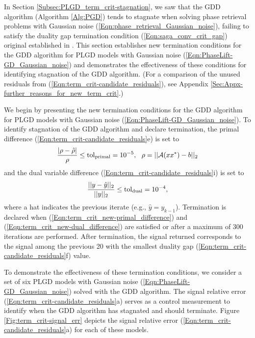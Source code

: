 In Section \ref{Subsec:PLGD_term_crit-stagnation}, we saw that the GDD algorithm (Algorithm \ref{Alg:PGD}) tends to stagnate when solving phase retrieval problems with Gaussian noise (\ref{Eqn:phase_retrieval_Gaussian_noise}), failing to satisfy the duality gap termination condition (\ref{Eqn:saga_conv_crit_gap}) original established in \cite{DBLP:journals/siamsc/FriedlanderM16}.  
This section establishes new termination conditions for the GDD algorithm for PLGD models with Gaussian noise (\ref{Eqn:PhaseLift-GD_Gaussian_noise}) and demonstrates the effectiveness of these conditions for identifying stagnation of the GDD algorithm.  
(For a comparison of the unused residuals from (\ref{Eqn:term_crit-candidate_residuals}), see Appendix \ref{Sec:Appx-further_reasons_for_new_term_crit}.)







We begin by presenting the new termination conditions for the GDD algorithm for PLGD models with Gaussian noise (\ref{Eqn:PhaseLift-GD_Gaussian_noise}).  To identify stagnation of the GDD algorithm and declare termination, the primal difference (\ref{Eqn:term_crit-candidate_residuals}e) is set to 
\begin{equation}
	\label{Eqn:term_crit_new-primal_difference}
\frac{| \rho - \hat{\rho} |}{\rho} \leq  \textnormal{tol}_\textnormal{primal} = 10^{-5}, \ \ \rho = ||{\mathcal A}(xx^*) - b||_2
\end{equation}
and the dual variable difference (\ref{Eqn:term_crit-candidate_residuals}i) is set to
\begin{equation}
	\label{Eqn:term_crit_new-dual_difference}
\frac{||y- \hat{y}||_2}{||y||_2} \leq \textnormal{tol}_\textnormal{dual}= 10^{-4},
\end{equation}
where a hat indicates the previous iterate (e.g., $\hat{y} = y_{k-1}$).  Termination is declared when (\ref{Eqn:term_crit_new-primal_difference}) and (\ref{Eqn:term_crit_new-dual_difference}) are satisfied or after a maximum of 300 iterations are performed.  After termination, the signal returned corresponds to the signal among the previous 20 with the smallest duality gap (\ref{Eqn:term_crit-candidate_residuals}f) value.  










To demonstrate the effectiveness of these termination conditions, we consider a set of six PLGD models with Gaussian noise (\ref{Eqn:PhaseLift-GD_Gaussian_noise}) solved with the GDD algorithm.   The signal relative error (\ref{Eqn:term_crit-candidate_residuals}a) serves as a control measurement to identify when the GDD algorithm has stagnated and should terminate.  Figure \ref{Fig:term_crit-signal_err} depicts the signal relative error (\ref{Eqn:term_crit-candidate_residuals}a) for each of these models.


